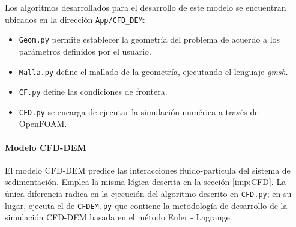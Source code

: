 \noindent
\justify

Los algoritmos desarrollados para el desarrollo de este modelo se encuentran ubicados en la direcci\'on \texttt{App/{CFD\_DEM}}:

\begin{itemize}
	\item \texttt{Geom.py} permite establecer la geometr\'ia del problema de acuerdo a los par\'ametros definidos por el usuario.
	\item \texttt{Malla.py} define el mallado de la geometr\'ia, ejecutando el lenguaje \textit{gmsh}.
	\item \texttt{CF.py} define las condiciones de frontera.
	\item \texttt{CFD.py} se encarga de ejecutar la simulaci\'on num\'erica a trav\'es de OpenFOAM.
\end{itemize}

\paragraph{Modelo CFD-DEM}

\noindent
\justify

El modelo CFD-DEM predice las interacciones fluido-part\'icula del sistema de sedimentaci\'on. Emplea la misma l\'ogica descrita en la secci\'on \ref{imp:CFD}. La \'unica diferencia radica en la ejecuci\'on del algoritmo descrito en \texttt{CFD.py}; en su lugar, ejecuta el de \texttt{CFDEM.py} que contiene la metodolog\'ia de desarrollo de la simulaci\'on CFD-DEM basada en el m\'etodo Euler - Lagrange.


